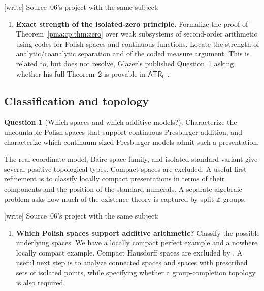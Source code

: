\documentclass[11pt]{article}
\numberwithin{equation}{section}
\theoremstyle{definition}
\newtheorem{question}[question]{Question}
\theoremstyle{remark}
\newcommand{\Z}{\mathbb Z}
\newcommand{\writetag}{\textup{\textsf{\small[write]}}}
\begin{document}
\noindent\writetag{} Source~06's project with the same subject:

\begin{enumerate}[label=\textbf{\arabic*.},leftmargin=*,start=6]

\item \textbf{Exact strength of the isolated-zero principle.}
Formalize the proof of Theorem~\ref{pma:cp:thm:zero} over weak subsystems
of second-order arithmetic using codes for Polish spaces and
continuous functions. Locate the strength of analytic/coanalytic
separation and of the coded measure argument. This is related to,
but does not resolve, Glazer's published Question~1 asking whether
his full Theorem~2 is provable in $\mathsf{ATR}_0$ \cite{Glazer}.

\end{enumerate}

\subsection{Classification and topology}

\begin{question}[Which spaces and which additive models?]
Characterize the uncountable Polish spaces that support continuous
Presburger addition, and characterize which continuum-sized Presburger
models admit such a presentation.
\end{question}
The real-coordinate model, Baire-space family, and isolated-standard
variant give several positive topological types. Compact spaces are
excluded. A useful first refinement is to classify locally compact
presentations in terms of their components and the position of the
standard numerals. A separate algebraic problem asks how much of the
existence theory is captured by split $\Z$-groups.

\noindent\writetag{} Source~06's project with the same subject:

\begin{enumerate}[label=\textbf{\arabic*.},leftmargin=*,start=4]

\item \textbf{Which Polish spaces support additive arithmetic?}
Classify the possible underlying spaces. We have a locally compact
perfect example and a nowhere locally compact example. Compact
Hausdorff spaces are excluded by \cite{EHW}. A useful next step is
to analyze connected spaces and spaces with prescribed sets of
isolated points, while specifying whether a group-completion
topology is also required.

\end{enumerate}
\end{document}
